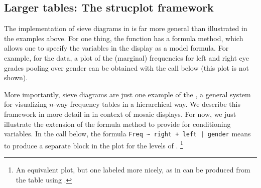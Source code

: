 \documentclass[11pt]{book}
\renewenvironment{knitrout}{\small\renewcommand{\baselinestretch}{.85}}{} %
\begin{document}
\subsection{Larger tables: The strucplot framework}\label{sec:twoway-sieve-larger}
The implementation of sieve diagrams in  is far more
general than illustrated in the examples above.  For one thing,
the  function has a formula method, which allows one to specify
the variables in the display as a model formula.
For example, for the  data, a plot of
the (marginal) frequencies for left and right eye grades
pooling over gender can be obtained with the call below
(this plot is not shown).

\begin{knitrout}
\color{fgcolor}\begin{kframe}
\begin{alltt}
 \hlopt{~}  \hlopt{+}     \hlstd{=}\hlstd{)}
\end{alltt}
\end{kframe}
\end{knitrout}

More importantly, sieve diagrams are just one example of
the , a general system for
visualizing $n$-way frequency tables in a hierarchical
way.  We describe this framework in more detail in
 in context of mosaic
displays.  For now, we just illustrate the extension of
the formula method to provide for conditioning variables.
In the call below, the formula \verb#Freq ~ right + left | gender#
means to produce a separate block in the plot for the levels of
.%
\footnote{
An equivalent plot, but one labeled more nicely, as in 
can be produced from the  table using
.
}
\end{document}
